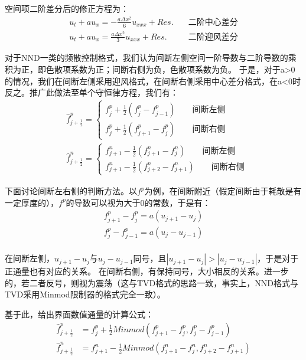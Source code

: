 \documentclass[12pt, a4paper]{article}
\begin{document}
空间项二阶差分后的修正方程为：
\begin{align}
    u_t + au_x = -\frac{a\Delta x^2}{6}u_{xxx}+Res.&\quad \text{二阶中心差分}\\
    u_t + au_x = \frac{a\Delta x^2}{3}u_{xxx}+Res.&\quad \text{二阶迎风差分}
\end{align}

对于NND一类的频散控制格式，我们认为间断左侧空间一阶导数与二阶导数的乘积为正，即色散项系数为正；间断右侧为负，色散项系数为负。
于是，对于a>0的情况，我们在间断左侧采用迎风格式，在间断右侧采用中心差分格式，在a<0时反之。推广此做法至单个守恒律方程，我们有：
\begin{align}
    &\widehat{f}^p_{j+\frac{1}{2}} =
    \begin{cases}
        f^p_j + \frac{1}{2}(f^p_j-f^p_{j-1})  \qquad \text{间断左侧} \\
        f^p_j + \frac{1}{2}(f^p_{j+1} - f^p_{j}) \qquad \text{间断右侧}
    \end{cases} \\
    &\widehat{f}^n_{j+\frac{1}{2}} =
    \begin{cases}
        f^n_{j+1} - \frac{1}{2}(f^n_{j+1} - f^n_{j}) \qquad \text{间断左侧} \\
        f^n_{j+1} - \frac{1}{2}(f^n_{j+2} - f^n_{j+1}) \qquad \text{间断右侧}
    \end{cases}
\end{align}

下面讨论间断左右侧的判断方法。以$f^p$为例，在间断附近（假定间断由于耗散是有一定厚度的），$f^p$的导数可以视为大于0的常数，于是有：
\begin{align}
    f^p_{j+1}-f^p_{j} = a(u_{j+1}-u_{j}) \\
    f^p_{j}-f^p_{j-1} = a(u_{j}-u_{j-1}) \\
\end{align}

在间断左侧，$u_{j+1}-u_{j}$与$u_j-u_{j-1}$同号，且$|u_{j+1} - u_j| > |u_j-u_{j-1}|$，于是对于正通量也有对应的关系。
在间断右侧，有保持同号，大小相反的关系。进一步的，若二者反号，则视为震荡（这与TVD格式的思路一致，事实上，NND格式与TVD采用Minmod限制器的格式完全一致）。

基于此，给出界面数值通量的计算公式：
\begin{align}
    \widehat{f}^p_{j+\frac{1}{2}} &= f^p_j + \frac{1}{2}Minmod(f^p_{j+1}-f^p_{j}, f^p_{j}-f^p_{j-1})\\
    \widehat{f}^n_{j+\frac{1}{2}} &= f^n_{j+1} - \frac{1}{2}Minmod(f^n_{j+1}-f^n_{j}, f^n_{j+2}-f^n_{j+1})
\end{align}
\end{document}
